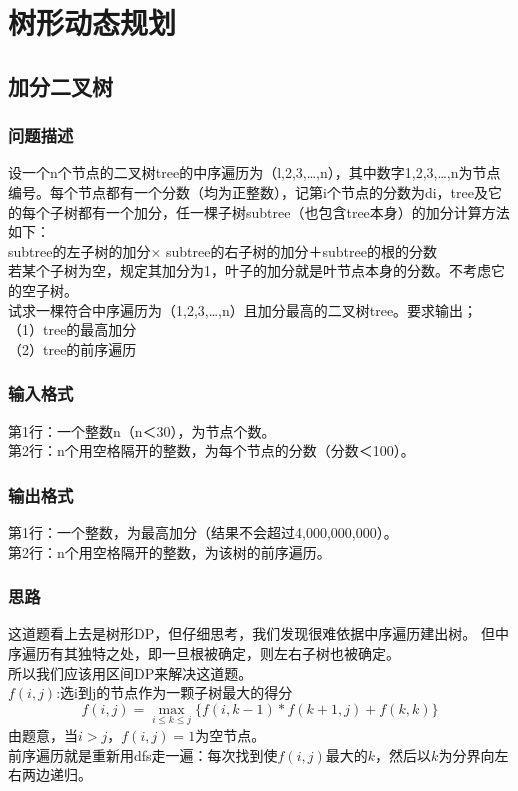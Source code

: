 \section{树形动态规划}

\subsection{加分二叉树}
    \subsubsection{问题描述}
        设一个n个节点的二叉树tree的中序遍历为（l,2,3,…,n），其中数字1,2,3,…,n为节点编号。每个节点都有一个分数（均为正整数），记第i个节点的分数为di，tree及它的每个子树都有一个加分，任一棵子树subtree（也包含tree本身）的加分计算方法如下：\\
        subtree的左子树的加分× subtree的右子树的加分＋subtree的根的分数\\
        若某个子树为空，规定其加分为1，叶子的加分就是叶节点本身的分数。不考虑它的空子树。\\
        试求一棵符合中序遍历为（1,2,3,…,n）且加分最高的二叉树tree。要求输出；\\
        （1）tree的最高加分\\
        （2）tree的前序遍历
    \subsubsection{输入格式}
        第1行：一个整数n（n＜30），为节点个数。\\
        第2行：n个用空格隔开的整数，为每个节点的分数（分数＜100）。
    \subsubsection{输出格式}
        第1行：一个整数，为最高加分（结果不会超过4,000,000,000）。\\
        第2行：n个用空格隔开的整数，为该树的前序遍历。
    \subsubsection{思路}
        这道题看上去是树形DP，但仔细思考，我们发现很难依据中序遍历建出树。
        但中序遍历有其独特之处，即一旦根被确定，则左右子树也被确定。\\
        所以我们应该用区间DP来解决这道题。\\
        $f(i,j)$:选i到j的节点作为一颗子树最大的得分
        $$f(i,j)=\max_{i \leq k \leq j}{\{f(i,k-1)*f(k+1,j)+f(k,k)\}}$$
        由题意，当$i>j$，$f(i,j)=1$为空节点。\\
        前序遍历就是重新用dfs走一遍：每次找到使$f(i,j)$最大的$k$，然后以$k$为分界向左右两边递归。

